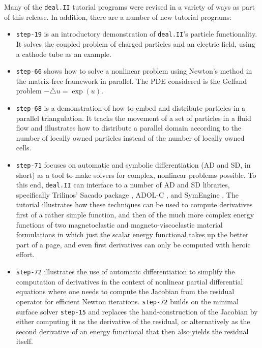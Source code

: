 \documentclass{ansarticle-preprint}
\newcommand{\specialword}[1]{\texttt{#1}}
\newcommand{\dealii}{{\specialword{deal.II}}\xspace}
\begin{document}
Many of the \dealii{} tutorial programs were revised in a variety of
ways as part of this release. In addition, there are a number of new tutorial programs:
\begin{itemize}
\item \texttt{step-19} is an introductory demonstration of \dealii{}'s
  particle functionality. It solves the coupled problem of
  charged particles and an electric field, using a cathode tube as an
  example.

\item \texttt{step-66} shows how to solve a nonlinear problem using Newton's method in the matrix-free
framework in parallel. The PDE considered is the Gelfand problem $-\triangle u = \exp(u)$.
  
\item \texttt{step-68} is a demonstration of how to embed and distribute
  particles in a parallel triangulation. It tracks the movement of
  a set of particles in a fluid flow and illustrates how to distribute
  a parallel domain according to the number of locally owned
  particles instead of the number of locally owned cells.

\item \texttt{step-71} focuses on automatic and symbolic
  differentiation (AD and SD, in short) as a tool to make solvers for complex,
  nonlinear problems possible. To this end, \dealii{} can interface to a number
  of AD and SD libraries, specifically Trilinos' Sacado package
  \cite{Bartlett2006a}, ADOL-C \cite{Griewank1996a}, and
  SymEngine \cite{symengine-web-page}. The tutorial
  illustrates how these techniques can be used to compute derivatives
  first of a rather simple function, and then of the much more complex
  energy functions of two magnetoelastic and magneto-viscoelastic
  material formulations in which just the scalar energy functional
  takes up the better part of a page, and even first derivatives can
  only be computed with heroic effort.

\item \texttt{step-72} illustrates the use of automatic
  differentiation to simplify the computation of derivatives in the
  context of nonlinear partial differential equations where one needs
  to compute the Jacobian from the residual operator for efficient
  Newton iterations. \texttt{step-72} builds on the minimal surface
  solver \texttt{step-15} and replaces the hand-construction of the
  Jacobian by either computing it as the derivative of the residual,
  or alternatively as the second derivative of an energy functional
  that then also yields the residual itself.


\end{itemize}
\end{document}
